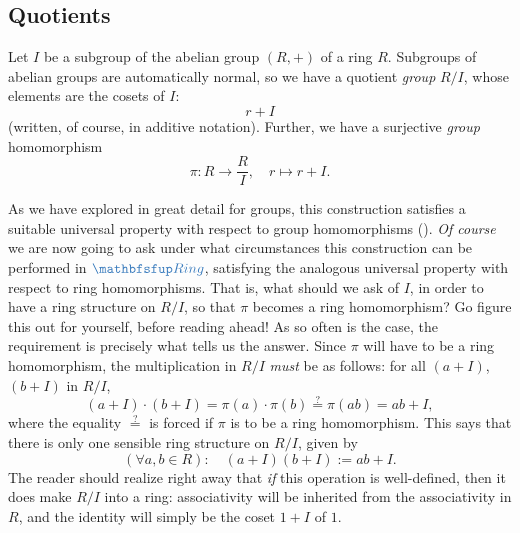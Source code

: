 \subsection{Quotients}
\label{subsec:rings:quotients}
Let $I$ be a subgroup of the abelian group $(R, +)$ of a ring
$R$. Subgroups of abelian groups are automatically normal, so we have
a quotient \emph{group} $R/I$, whose elements are the cosets of $I$:
\[
  r + I
\]
(written, of course, in additive notation). Further, we have a
surjective \emph{group} homomorphism
\[
  \pi : R \to \frac{R}{I}, \quad r \mapsto r + I.
\]

As we have explored in great detail for groups, this construction
satisfies a suitable universal property with respect to group
homomorphisms
(). \emph{Of course} we
are now going to ask under what circumstances this construction can be
performed in $\categ{Ring}$, satisfying the analogous universal
property with respect to ring homomorphisms.  That is, what should we
ask of $I$, in order to have a ring structure on $R/I$, so that $\pi$
becomes a ring homomorphism? Go figure this out for yourself, before
reading ahead!  As so often is the case, the requirement is precisely
what tells us the answer. Since $\pi$ will have to be a ring
homomorphism, the multiplication in $R/I$ \emph{must} be as follows:
for all $(a + I)$, $(b + I)$ in $R/I$,
\[
  (a + I) \cdot (b + I) = \pi(a) \cdot \pi(b) \stackrel{?}{=} \pi(ab)
  = ab + I,
\]
where the equality $\stackrel{?}{=}$ is forced if $\pi$ is to be a
ring homomorphism.  This says that there is only one sensible ring
structure on $R/I$, given by
\[
  (\forall a, b \in R) : \quad (a + I)(b + I) := ab + I.
\]
The reader should realize right away that \emph{if} this operation is
well-defined, then it does make $R/I$ into a ring: associativity will
be inherited from the associativity in $R$, and the identity will
simply be the coset $1 + I$ of $1$.

